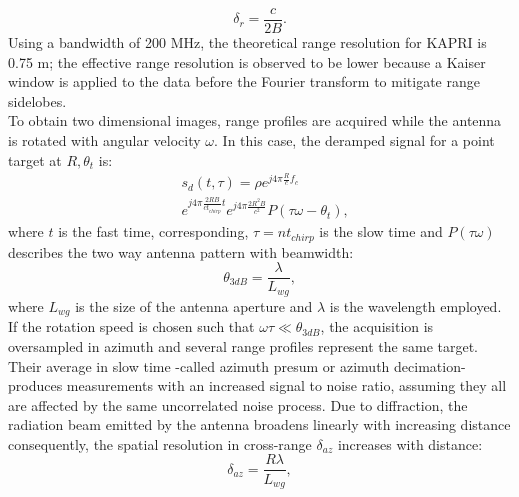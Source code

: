 \begin{equation}\label{eq:range_resolution_theoretical}
	\delta_{r} = \frac{c}{2 B}.
\end{equation}
Using a bandwidth of 200 MHz, the theoretical range resolution for KAPRI is 0.75 m\cite{Strozzi2011}; the effective range resolution is observed to be lower because a Kaiser window is applied to the data before the Fourier transform to mitigate range sidelobes.\\
To obtain two dimensional images, range profiles are acquired while the antenna is rotated with angular velocity $\omega$. 
In this case, the deramped signal for a point target at $R,\theta_t$ is:
\begin{equation}\label{eq:signal_model}
	\begin{aligned}
	& s_{d}\left(t,\tau\right) = \rho e^{j 4 \pi \frac{ R}{c}f_c}   \\
	& e^{j 4 \pi \frac{2 R B }{c t_{chirp}} t}  e^{j 4 \pi \frac{2 R^2 B}{c^2}} P\left(\tau \omega - \theta_t\right),
	\end{aligned}
\end{equation} 
where $t$ is the fast time, corresponding, $\tau = n t_{chirp}$ is the slow time and $P\left(\tau \omega\right)$ describes the two way antenna pattern with beamwidth:
\begin{equation}\label{eq:azimuth_resolution}
	\theta_{3dB} = \frac{\lambda}{L_{wg}},
\end{equation}
where $L_{wg}$ is the size of the antenna aperture and $\lambda$ is the wavelength employed.
If the rotation speed is chosen such that $\omega \tau \ll \theta_{3dB}$, the acquisition is oversampled in azimuth and several range profiles represent the same target. Their average in slow time  -called azimuth presum or azimuth decimation- produces measurements with an increased signal to noise ratio, assuming they all are affected by the same uncorrelated noise process.
Due to diffraction, the radiation beam emitted by the antenna broadens linearly with increasing distance consequently, the spatial resolution in cross-range $\delta_{az}$ increases with distance:
\begin{equation}\label{eq:azimuth_ground_resolution}
	\delta_{az} = \frac{R \lambda}{L_{wg}},
\end{equation}
